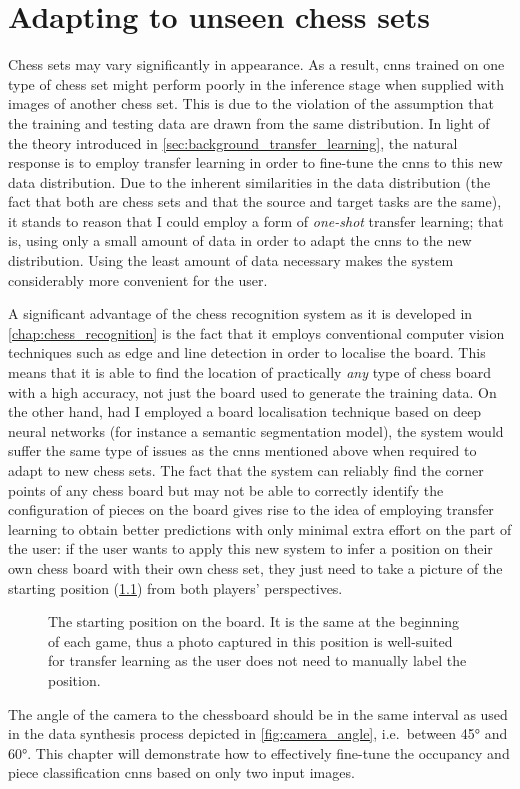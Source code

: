 \documentclass[../report.tex]{subfiles}
\begin{document}
\chapter{Adapting to unseen chess sets}
\label{chap:adapting}

Chess sets may vary significantly in appearance. 
As a result, \glspl{cnn} trained on one type of chess set might perform poorly in the inference stage when supplied with images of another chess set. 
This is due to the violation of the assumption that the training and testing data are drawn from the same distribution.
In light of the theory introduced in \cref{sec:background_transfer_learning}, the natural response is to employ transfer learning in order to fine-tune the \glspl{cnn} to this new data distribution.
Due to the inherent similarities in the data distribution (the fact that both are chess sets and that the source and target tasks are the same), it stands to reason that I could employ a form of \emph{one-shot} transfer learning; 
that is, using only a small amount of data in order to adapt the \glspl{cnn} to the new distribution.
Using the least amount of data necessary makes the system considerably more convenient for the user.

A significant advantage of the chess recognition system as it is developed in \cref{chap:chess_recognition} is the fact that it employs conventional computer vision techniques such as edge and line detection in order to localise the board.
This means that it is able to find the location of practically \emph{any} type of chess board with a high accuracy, not just the board used to generate the training data.
On the other hand, had I employed a board localisation technique based on deep neural networks (for instance a semantic segmentation model), the system would suffer the same type of issues as the \glspl{cnn} mentioned above when required to adapt to new chess sets.
The fact that the system can reliably find the corner points of any chess board but may not be able to correctly identify the configuration of pieces on the board gives rise to the idea of employing transfer learning to obtain better predictions with only minimal extra effort on the part of the user:
if the user wants to apply this new system to infer a position on their own chess board with their own chess set, they just need to take a picture of the starting position (\cref{fig:chess_start_position}) from both players' perspectives.
\begin{figure}[h]
    \centering
    \newgame
    \showboard
    \caption[The starting position on the board.]{The starting position on the board. It is the same at the beginning of each game, thus a photo captured in this position is well-suited for transfer learning as the user does not need to manually label the position.}
    \label{fig:chess_start_position}
\end{figure}
The angle of the camera to the chessboard should be in the same interval as used in the data synthesis process depicted in \cref{fig:camera_angle}, i.e.\ between 45° and 60°.
This chapter will demonstrate how to effectively fine-tune the occupancy and piece classification \glspl{cnn} based on only two input images.
\end{document}
